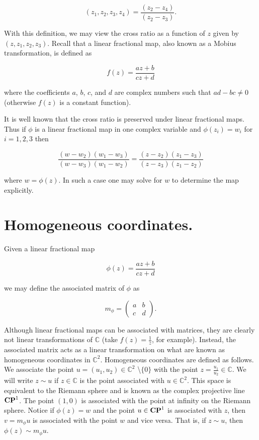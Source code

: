 \documentclass{amsart}
\theoremstyle{theorem}
\theoremstyle{lemma}
\theoremstyle{definition}
\begin{document}
$$(z_1, z_2, z_3, z_4)=\frac{(z_2-z_4)}{(z_2-z_3)}.$$

With this definition, we may view the cross ratio as a function of $z$ given by $(z, z_1 , z_2, z_3)$. Recall that a linear fractional map, also known as a Mobius transformation, is defined as 

$$f(z)=\frac{az+b}{cz+d}$$

\noindent where the coefficients $a$, $b$, $c$, and $d$ are complex numbers such that $ad-bc \neq 0$ (otherwise $f(z)$ is a constant function).

It is well known that the cross ratio is preserved under linear fractional maps. Thus if $\phi$ is a linear fractional map in one complex variable and $\phi(z_i)=w_i$ for $i=1,2,3$ then 

$$\frac{(w-w_2)(w_1-w_3)}{(w-w_3)(w_1-w_2)}=\frac{(z-z_2)(z_1-z_3)}{(z-z_3)(z_1-z_2)}$$

\noindent where $w=\phi(z)$. In such a case one may solve for $w$ to determine the map explicitly.

\section{Homogeneous coordinates.}

Given a linear fractional map

$$\phi(z)=\frac{az+b}{cz+d}$$

\noindent we may define the associated matrix of $\phi$ as 

\begin{equation*}
    m_{\phi} = \begin{pmatrix}
        a & b \\
        c & d
     \end{pmatrix}.
\end{equation*}

Although linear fractional maps can be associated with matrices, they are clearly not linear transformations of $\mathbb{C}$ (take $f(z)=\frac{1}{z}$, for example). Instead, the associated matrix acts as a linear transformation on what are known as homogeneous coordinates in $\mathbb{C}^2$. Homogeneous coordinates are defined as follows. We associate the point $u=(u_1, u_2) \in \mathbb{C}^2$ \textbackslash $\{0\}$ with the point $z=\frac{u_1}{u_2} \in \mathbb{C}$. We will write $z \sim u$ if $z \in \mathbb{C}$ is the point associated with $u \in \mathbb{C}^2$. This space is equivalent to the Riemann sphere and is known as the complex projective line  ${\bf CP}^1$. The point $(1,0)$ is associated with the point at infinity on the Riemann sphere.  Notice if $\phi(z)=w$ and the point $u \in {\bf CP}^1$ is associated with $z$, then $v=m_{\phi}u$ is associated with the point $w$ and vice versa. That is, if $z \sim u$, then $\phi(z) \sim m_{\phi}u$.
\end{document}
